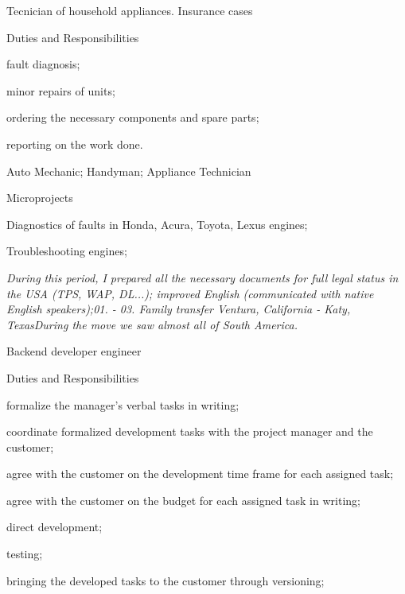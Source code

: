 \label{md_readme_autotoc_md1}%
%

Tecnician of household appliances. Insurance cases

Duties and Responsibilities


\begin{DoxyItemize}
\item fault diagnosis;
\item minor repairs of units;
\item ordering the necessary components and spare parts;
\item reporting on the work done.
\end{DoxyItemize}

\label{md_readme_autotoc_md2}%
%

Auto Mechanic; Handyman; Appliance Technician

Microprojects


\begin{DoxyItemize}
\item Diagnostics of faults in Honda, Acura, Toyota, Lexus engines;
\item Troubleshooting engines;
\end{DoxyItemize}

{\itshape During this period, I prepared all the necessary documents for full legal status in the USA (TPS, WAP, DL...); improved English (communicated with native English speakers);01. -\/ 03. Family transfer Ventura, California -\/ Katy, Texas\+During the move we saw almost all of South America.}

\label{md_readme_autotoc_md3}%
%

Backend developer engineer

Duties and Responsibilities


\begin{DoxyItemize}
\item formalize the manager’s verbal tasks in writing;
\item coordinate formalized development tasks with the project manager and the customer;
\item agree with the customer on the development time frame for each assigned task;
\item agree with the customer on the budget for each assigned task in writing;
\item direct development;
\item testing;
\item bringing the developed tasks to the customer through versioning; 
\end{DoxyItemize}
